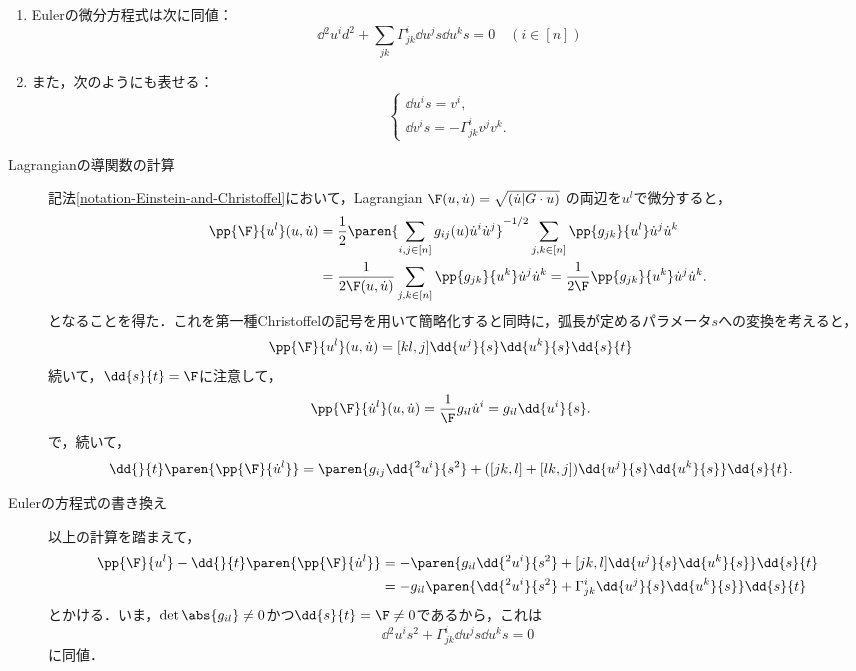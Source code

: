 \documentclass[uplatex,dvipdfmx]{jsreport}
\begin{document}
\begin{theorem}\mbox{}
    \begin{enumerate}
        \item Eulerの微分方程式は次に同値：
        \[\dd{^2u^i}{d^2}+\sum_{jk}\Gamma_{jk}^i\dd{u^j}{s}\dd{u^k}{s}=0\quad(i\in[n])\]
        \item また，次のようにも表せる：
        \[\begin{cases}
            \dd{u^i}{s}=v^i,\\
            \dd{v^i}{s}=-\Gamma^i_{jk}v^jv^k.
        \end{cases}\]
    \end{enumerate}
\end{theorem}
\begin{Proof}\mbox{}
    \begin{description}
        \item[Lagrangianの導関数の計算] 記法\ref{notation-Einstein-and-Christoffel}において，Lagrangian $\F(u,\dot{u})=\sqrt{(\dot{u}|G\cdot{u})}$
        の両辺を$u^l$で微分すると，
        \begin{align*}
            \pp{\F}{u^l}(u,\dot{u})&=\frac{1}{2}\paren{\sum_{i,j\in[n]}g_{ij}(u)\dot{u}^i\dot{u}^j}^{-1/2}\sum_{j,k\in[n]}\pp{g_{jk}}{u^l}\dot{u}^j\dot{u}^k\\
            &=\frac{1}{2\F(u,\dot{u})}\sum_{j,k\in[n]}\pp{g_{jk}}{u^k}\dot{u}^j\dot{u}^k=\frac{1}{2\F}\pp{g_{jk}}{u^k}\dot{u}^j\dot{u}^k.
        \end{align*}
        となることを得た．これを第一種Christoffelの記号を用いて簡略化すると同時に，弧長が定めるパラメータ$s$への変換を考えると，
        \begin{align*}
            \pp{\F}{u^l}(u,\dot{u})&=[kl,j]\dd{u^j}{s}\dd{u^k}{s}\dd{s}{t}
        \end{align*}
        続いて，$\dd{s}{t}=\F$に注意して，
        \begin{align*}
            \pp{\F}{\dot{u}^l}(u,\dot{u})&=\frac{1}{\F}g_{il}\dot{u}^i=g_{il}\dd{u^i}{s}.
        \end{align*}
        で，続いて，
        \begin{align*}
            \dd{}{t}\paren{\pp{\F}{\dot{u}^l}}&=\paren{g_{ij}\dd{^2u^i}{s^2}+([jk,l]+[lk,j])\dd{u^j}{s}\dd{u^k}{s}}\dd{s}{t}.
        \end{align*}
        \item[Eulerの方程式の書き換え] 以上の計算を踏まえて，
        \begin{align*}
            \pp{\F}{u^l}-\dd{}{t}\paren{\pp{\F}{\dot{u}^l}}&=-\paren{g_{il}\dd{^2u^i}{s^2}+[jk,l]\dd{u^j}{s}\dd{u^k}{s}}\dd{s}{t}\\
            &=-g_{il}\paren{\dd{^2u^i}{s^2}+\Gamma^i_{jk}\dd{u^j}{s}\dd{u^k}{s}}\dd{s}{t}
        \end{align*}
        とかける．いま，$\det\abs{g_{il}}\ne0$かつ$\dd{s}{t}=\F\ne0$であるから，これは
        \[\dd{^2u^i}{s^2}+\Gamma^i_{jk}\dd{u^j}{s}\dd{u^k}{s}=0\]
        に同値．
    \end{description}
\end{Proof}
\end{document}
